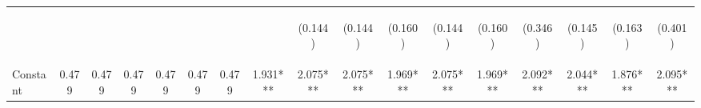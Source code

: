 \begin{center}
\begin{tabular}{lcccccccccccccccc}
\vspace{4pt} & \begin{footnotesize}\end{footnotesize} & \begin{footnotesize}\end{footnotesize} & \begin{footnotesize}\end{footnotesize} & \begin{footnotesize}\end{footnotesize} & \begin{footnotesize}\end{footnotesize} & \begin{footnotesize}\end{footnotesize} & \begin{footnotesize}\end{footnotesize} & \begin{footnotesize}(0.144)\end{footnotesize} & \begin{footnotesize}(0.144)\end{footnotesize} & \begin{footnotesize}(0.160)\end{footnotesize} & \begin{footnotesize}(0.144)\end{footnotesize} & \begin{footnotesize}(0.160)\end{footnotesize} & \begin{footnotesize}(0.346)\end{footnotesize} & \begin{footnotesize}(0.145)\end{footnotesize} & \begin{footnotesize}(0.163)\end{footnotesize} & \begin{footnotesize}(0.401)\end{footnotesize} \\
Constant & 0.479 & 0.479 & 0.479 & 0.479 & 0.479 & 0.479 & 1.931*** & 2.075*** & 2.075*** & 1.969*** & 2.075*** & 1.969*** & 2.092*** & 2.044*** & 1.876*** & 2.095*** \\

\end{tabular}
\end{center}
